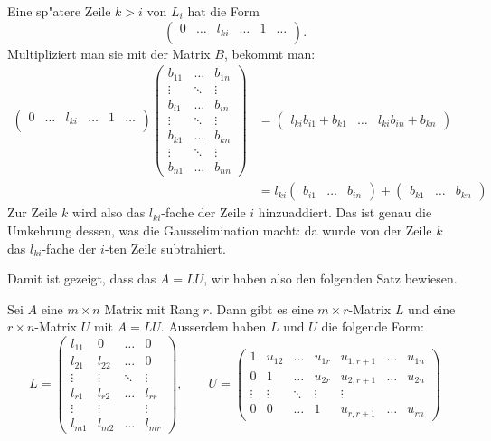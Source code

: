 Eine sp"atere Zeile $k>i$ von $L_i$ hat die Form
\[
\begin{pmatrix}
0&\dots&l_{ki}&\dots&1&\dots\\
\end{pmatrix}.
\]
Multipliziert man sie mit der Matrix $B$, bekommt man:
\begin{align*}
\begin{pmatrix}
0&\dots&l_{ki}&\dots&1&\dots\\
\end{pmatrix}
\begin{pmatrix}
b_{11}&\dots &b_{1n}\\
\vdots&\ddots&\vdots\\
b_{i1}&\dots &b_{in}\\
\vdots&\ddots&\vdots\\
b_{k1}&\dots&b_{kn}\\
\vdots&\ddots&\vdots\\
b_{n1}&\dots &b_{nn}
\end{pmatrix}
&=
\begin{pmatrix}
l_{ki}b_{i1}+b_{k1}
&\dots&
l_{ki}b_{in}+b_{kn}
\end{pmatrix}
\\
&=
l_{ki}
\begin{pmatrix}
b_{i1}
&\dots&
b_{in}
\end{pmatrix}
+
\begin{pmatrix}
b_{k1}
&\dots&
b_{kn}
\end{pmatrix}
\end{align*}
Zur Zeile $k$ wird also das $l_{ki}$-fache der Zeile
$i$ hinzuaddiert.
Das ist genau die Umkehrung dessen, was
die Gausselimination macht: da wurde von der Zeile $k$
das $l_{ki}$-fache der $i$-ten Zeile subtrahiert.

Damit ist gezeigt, dass das $A=LU$, wir haben also den folgenden
Satz bewiesen.

\begin{satz}[LU-Zerlegung]
\label{ludecomposition}
Sei $A$ eine $m\times n$ Matrix mit Rang $r$.
Dann gibt es eine $m\times r$-Matrix $L$ und eine $r\times n$-Matrix
$U$ mit $A=LU$.
Ausserdem haben $L$ und $U$ die folgende Form:
\[
L=\begin{pmatrix}
l_{11}&0&\dots&0\\
l_{21}&l_{22}&\dots&0\\
\vdots&\vdots&\ddots&\vdots\\
l_{r1}&l_{r2}&\dots&l_{rr}\\
\vdots&\vdots& &\vdots\\
l_{m1}&l_{m2}&\dots&l_{mr}
\end{pmatrix},\qquad
U=\begin{pmatrix}
1&u_{12}&\dots&u_{1r}&u_{1,r+1}&\dots&u_{1n}\\
0&1     &\dots&u_{2r}&u_{2,r+1}&\dots&u_{2n}\\
\vdots&\vdots&\ddots&\vdots&\vdots\\
0&0&\dots&1&u_{r,r+1}&\dots&u_{rn}
\end{pmatrix}
\]
\end{satz}

